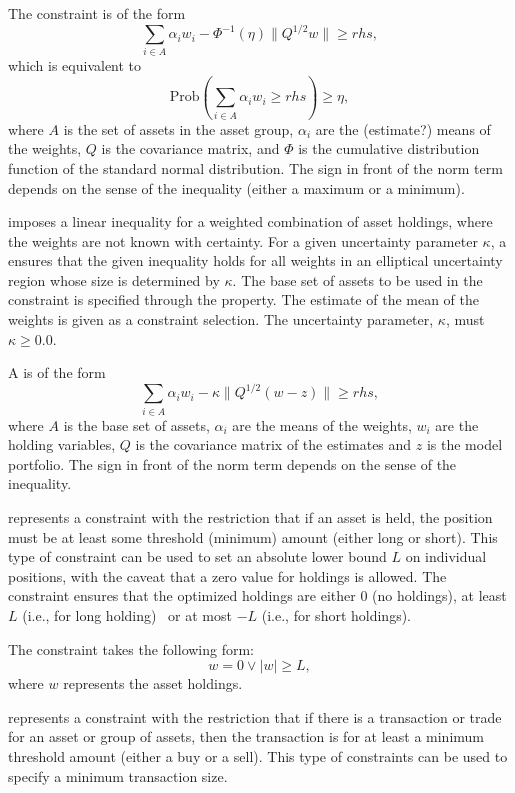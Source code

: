    The constraint is of the form 
   \[
       \sum_{i\in A}\alpha_i w_i - \Phi^{-1}(\eta)\|Q^{1/2} w\| \ge rhs,
   \]
   which is equivalent to
   \[
       \text{Prob}\left(\sum_{i\in A}\alpha_i w_i \ge rhs\right) \ge \eta,
   \]
   where $A$ is the set of assets in the asset group, 
   $\alpha_i$ are the (estimate?) means of the weights, $Q$ is the covariance matrix, 
   and $\Phi$ is the cumulative distribution function of the standard normal distribution. 
   The sign in front of the norm term depends on the sense of the inequality (either a maximum or a minimum). 

   imposes a linear inequality for a weighted combination of asset holdings, 
   where the weights are not known with certainty. 
   For a given uncertainty parameter $\kappa$, a  ensures that the given inequality holds 
   for all weights in an elliptical uncertainty region whose size is determined by $\kappa$. 
   The base set of assets to be used in the constraint is specified through the  property. 
   The estimate of the mean of the weights is given as a constraint selection. 
   The uncertainty parameter, $\kappa$, must $\kappa\ge 0.0$.
 
   A  is of the form
   \[
      \sum_{i\in A} \alpha_i w_i - \kappa \|Q^{1/2}(w-z)\| \ge rhs,
   \]
   where $A$ is the base set of assets, 
   $\alpha_i$ are the means of the weights, 
   $w_i$ are the holding variables, $Q$ is the covariance matrix of the estimates and $z$ is the model portfolio. 
   The sign in front of the norm term depends on the sense of the inequality. 

   represents a constraint with the restriction that if an asset is held, 
   the position must be at least some threshold (minimum) amount (either long or short).
   This type of constraint can be used to set an absolute lower bound $L$ on individual positions,
   with the caveat that a zero value for holdings is allowed. 
   The constraint ensures that the optimized holdings are either 0 (no holdings), at least $L$ (i.e., for long holding) \
   or at most $-L$ (i.e., for short holdings). 

   The constraint takes the following form:
   \[
        w = 0 \vee |w| \ge L,
   \]
   where $w$ represents the asset holdings.

   represents a constraint with the restriction that if there is a transaction or trade for an asset or group of assets,
   then the transaction is for at least a minimum threshold amount (either a buy or a sell). 
   This type of constraints can be used to specify a minimum transaction size. 

